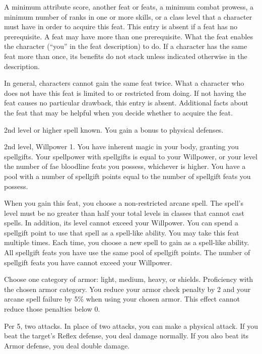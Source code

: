 \featpre A minimum attribute score, another feat or feats, a minimum combat prowess, a minimum number of ranks in one or more skills, or a class level that a character must have in order to acquire this feat.
This entry is absent if a feat has no prerequisite.
A feat may have more than one prerequisite.
\featben What the feat enables the character (``you'' in the feat description) to do.
If a character has the same feat more than once, its benefits do not stack unless indicated otherwise in the description.
\par In general, characters cannot gain the same feat twice.
What a character who does not have this feat is limited to or restricted from doing.
If not having the feat causes no particular drawback, this entry is absent.
Additional facts about the feat that may be helpful when you decide whether to acquire the feat.

\featpre 2nd level or higher  spell known.
\featben You gain a  bonus to physical defenses.

\featpres 2nd level, Willpower 1.
\featben You have inherent magic in your body, granting you spellgifts.
Your spellpower with spellgifts is equal to your Willpower, or your level \add the number of fae bloodline feats you possess, whichever is higher.
You have a pool with a number of spellgift points equal to the number of spellgift feats you possess.

When you gain this feat, you choose a non-restricted arcane spell.
The spell's level must be no greater than half your total levels in classes that cannot cast spells.
In addition, its level cannot exceed your Willpower.
You can spend a spellgift point to use that spell as a spell-like ability.
You may take this feat multiple times.
Each time, you choose a new spell to gain as a spell-like ability.
All spellgift feats you have use the same pool of spellgift points.
The number of spellgift feats you have cannot exceed your Willpower.

Choose one category of armor: light, medium, heavy, or shields.
\featpre Proficiency with the chosen armor category.
\featben You reduce your armor check penalty by 2 and your arcane spell failure by 5\% when using your chosen armor.
This effect cannot reduce those penalties below 0.

\featpre Per 5, two attacks.
\featben In place of two attacks, you can make a physical attack.
If you beat the target's Reflex defense, you deal damage normally.
If you also beat its Armor defense, you deal double damage.

